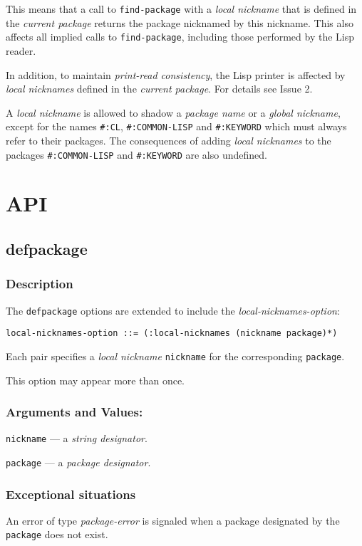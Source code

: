 \documentclass[11pt]{article}
\begin{document}
This means that a call to \texttt{find-package} with a \emph{local nickname} that is defined in
the \emph{current package} returns the package nicknamed by this nickname. This also
affects all implied calls to \texttt{find-package}, including those performed by the Lisp
reader.

In addition, to maintain \emph{print-read consistency}, the Lisp printer is affected by
\emph{local nicknames} defined in the \emph{current package}.  For details see Issue 2.

A \emph{local nickname} is allowed to shadow a \emph{package name} or a \emph{global nickname},
except for the names \texttt{\#:CL}, \texttt{\#:COMMON-LISP} and \texttt{\#:KEYWORD} which must always
refer to their packages. The consequences of adding \emph{local nicknames} to the
packages \texttt{\#:COMMON-LISP} and \texttt{\#:KEYWORD} are also undefined.
\section{API}
\label{sec:org85a42da}
\subsection{defpackage}
\label{sec:org645e8ec}
\subsubsection{Description}
\label{sec:orga17c629}
The \texttt{defpackage} options are extended to include the \emph{local-nicknames-option}:
\begin{verbatim}
local-nicknames-option ::= (:local-nicknames (nickname package)*)
\end{verbatim}


Each pair specifies a \emph{local nickname} \texttt{nickname} for the corresponding \texttt{package}.

This option may appear more than once.
\subsubsection{Arguments and Values:}
\label{sec:org91ed076}
\texttt{nickname} --- a \emph{string designator}.

\texttt{package} --- a \emph{package designator}.
\subsubsection{Exceptional situations}
\label{sec:org87b6096}
An error of type \emph{package-error} is signaled when a package designated by the
\texttt{package} does not exist.
\end{document}
